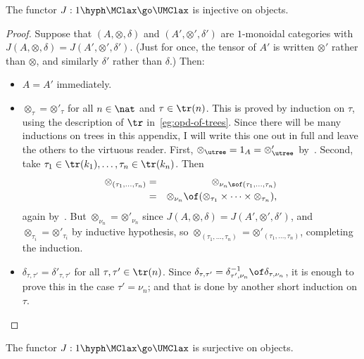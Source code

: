 \begin{lemma}	
The functor $J: 1\hyph\MClax \go \UMClax$ is injective on objects.
\end{lemma}

\begin{proof}
Suppose that $(A, \otimes, \delta)$ and $(A', \otimes', \delta')$ are
$1$-monoidal categories with $J(A, \otimes, \delta) = J(A', \otimes',
\delta')$.  (Just for once, the tensor of $A'$ is written $\otimes'$ rather
than $\otimes$, and similarly $\delta'$ rather than $\delta$.)  Then:
%
\begin{itemize}
\item $A = A'$ immediately.
\item $\otimes_\tau = \otimes'_\tau$ for all $n\in\nat$ and
$\tau\in\tr(n)$.  This is proved by induction on $\tau$, using the
description of $\tr$ in~\ref{eg:opd-of-trees}.  Since there will be many
inductions on trees in this appendix, I will write this one out in full and
leave the others to the virtuous reader.  First, $\otimes_\utree = 1_A =
\otimes'_\utree$ by~.  Second, take $\tau_1\in\tr(k_1), \ldots,
\tau_n\in\tr(k_n)$. Then
%
\begin{eqnarray*}
\otimes_{(\tau_1, \ldots, \tau_n)}	&=	&
\otimes_{\nu_n \sof (\tau_1, \ldots, \tau_n)}	\\
&=&\otimes_{\nu_n} \of (\otimes_{\tau_1} \times\cdots\times
\otimes_{\tau_n}),   
\end{eqnarray*}
%
again by~.  But $\otimes_{\nu_n} = \otimes'_{\nu_n}$ since
$J(A, \otimes, \delta) = J(A', \otimes', \delta')$, and $\otimes_{\tau_i} =
\otimes'_{\tau_i}$ by inductive hypothesis, so $\otimes_{(\tau_1, \ldots,
\tau_n)} = \otimes'_{(\tau_1, \ldots, \tau_n)}$, completing the induction.
\item $\delta_{\tau,\tau'} = \delta'_{\tau,\tau'}$ for all $\tau, \tau' \in
\tr(n)$.  Since $\delta_{\tau,\tau'} = \delta_{\tau',\nu_n}^{-1} \of
\delta_{\tau,\nu_n}$, it is enough to prove this in the case
$\tau'=\nu_n$; and that is done by another short induction on $\tau$.
\done
\end{itemize}
\end{proof}

\begin{lemma}
The functor $J: 1\hyph\MClax \go \UMClax$ is surjective on objects.
\end{lemma}


